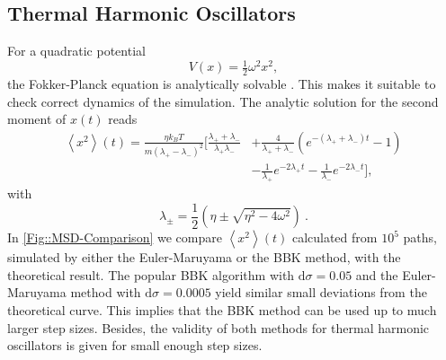 	\subsection{Thermal Harmonic Oscillators}
	For a quadratic potential
	\begin{equation}
		V(x) =	\tfrac{1}{2} \omega^2 x^2,
	\end{equation}
	the Fokker-Planck equation is analytically solvable \cite{risken1996fokker}. This makes it suitable to check correct dynamics of the simulation. The analytic solution for the second moment of $x(t)$ reads
	\begin{equation} \label{Eq::MSD-HO}
		\begin{split}
					\left \langle x^2 \right \rangle (t)  =	\frac{\eta {k_B T}}{m (\lambda_+ - \lambda_-)^2} \bigg[ \frac{\lambda_+ + \lambda_-}{\lambda_+ \lambda_-} &+ \frac{4}{\lambda_+ + \lambda_-} \left(e^{- (\lambda_+ + \lambda_-) t} - 1\right) \\
					&- \frac{1}{\lambda_+} e^{-2\lambda_+ t} - \frac{1}{\lambda_-} e^{- 2 \lambda_- t}\bigg],
		\end{split}
	\end{equation}
	with
	\begin{equation}
		\lambda_{\pm} =	\frac{1}{2} \left(\eta \pm \sqrt{\eta^2 - 4 \omega^2}\right)~.
	\end{equation}
	In \autoref{Fig::MSD-Comparison} we compare $\left \langle x^2 \right \rangle (t)$ calculated from $10^5$ paths, simulated by either the Euler-Maruyama or the BBK method, with the theoretical result. The popular BBK algorithm with $\text{d}\sigma=0.05$ and the Euler-Maruyama method with $\text{d}\sigma =	0.0005$ yield similar small deviations from the theoretical curve. This implies that the BBK method can be used up to much larger step sizes. Besides, the validity of both methods for thermal harmonic oscillators is given for small enough step sizes.
	
